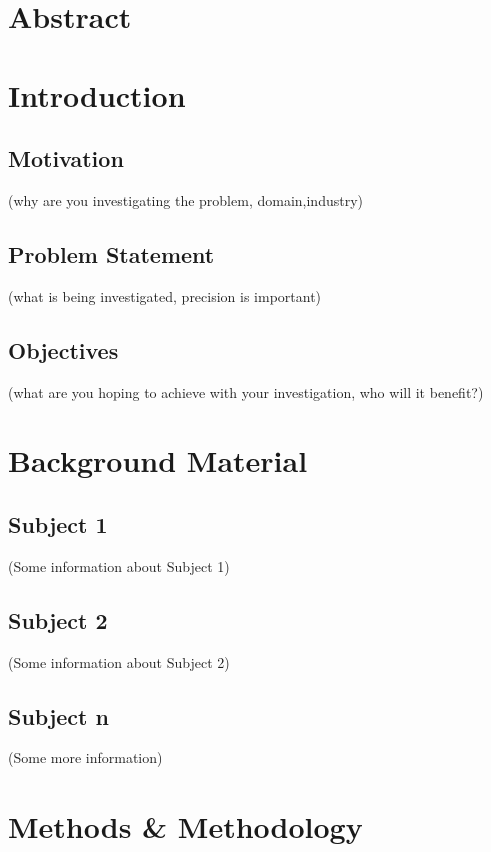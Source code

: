 \newpage
\section{Abstract}
\section{Introduction}
\subsection{Motivation}
\vspace{-1.5mm}
(why are you investigating the problem, domain,industry)
\vspace{-2mm}
\subsection{Problem Statement}
\vspace{-1.5mm}
 (what is being investigated, precision is important)
\vspace{-2mm}
\subsection{Objectives}
\vspace{-1.5mm}
(what are you hoping to achieve with your investigation, who will it benefit?)
\newpage
\section{Background Material}
\subsection{Subject 1}
\vspace{-1.5mm}
(Some information about Subject 1)
\vspace{-2mm}
\subsection{Subject 2}
\vspace{-1.5mm}
(Some information about Subject 2)
\subsection{Subject n}
\vspace{-1.5mm}
(Some more information)
\newpage
\section{Methods \& Methodology}
